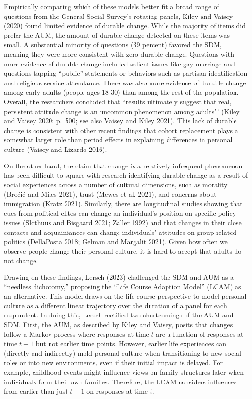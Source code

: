 \documentclass[
  12pt,
]{article}
\begin{document}
Empirically comparing which of these models better fit a broad range of
questions from the General Social Survey's rotating panels, Kiley and
Vaisey (2020) found limited evidence of durable change. While the
majority of items did prefer the AUM, the amount of durable change
detected on these items was small. A substantial minority of questions
(39 percent) favored the SDM, meaning they were more consistent with
zero durable change. Questions with more evidence of durable change
included salient issues like gay marriage and questions tapping
``public'' statements or behaviors such as partisan identification and
religious service attendance. There was also more evidence of durable
change among early adults (people ages 18-30) than among the rest of the
population. Overall, the researchers concluded that ``results ultimately
suggest that real, persistent attitude change is an uncommon phenomenon
among adults'\,' (Kiley and Vaisey 2020: p.~500; see also Vaisey and
Kiley 2021). This lack of durable change is consistent with other recent
findings that cohort replacement plays a somewhat larger role than
period effects in explaining differences in personal culture (Vaisey and
Lizardo 2016).

On the other hand, the claim that change is a relatively infrequent
phenomenon has been difficult to square with research identifying
durable change as a result of social experiences across a number of
cultural dimensions, such as morality (Broćić and Miles 2021), trust
(Mewes et al. 2021), and concerns about immigration (Kratz 2021).
Similarly, there are longitudinal studies showing that cues from
political elites can change an individual's position on specific policy
issues (Slothuus and Bisgaard 2021; Zaller 1992) and that changes in
their close contacts and acquaintances can change individuals' attitudes
on group-related politics (DellaPosta 2018; Gelman and Margalit 2021).
Given how often we observe people change their personal culture, it is
hard to accept that adults do not change.

Drawing on these findings, Lersch (2023) challenged the SDM and AUM as a
``needless dichotomy,'' proposing the ``Life Course Adaption Model''
(LCAM) as an alternative. This model draws on the life course
perspective to model personal culture as a different linear trajectory
over the duration of a panel for each respondent. In doing this, Lersch
rectified two shortcomings of the AUM and SDM. First, the AUM, as
described by Kiley and Vaisey, posits that changes follow a Markov
process where responses at time \(t\) are a function of responses at
time \(t-1\) but not earlier time points. However, earlier life
experiences can (directly and indirectly) mold personal culture when
transitioning to new social roles or into new environments, even if
their initial impact is delayed. For example, childhood events might
influence views on family structures later when individuals form their
own families. Therefore, the LCAM considers influences from earlier than
just \(t-1\) on responses at time \(t\).
\end{document}
